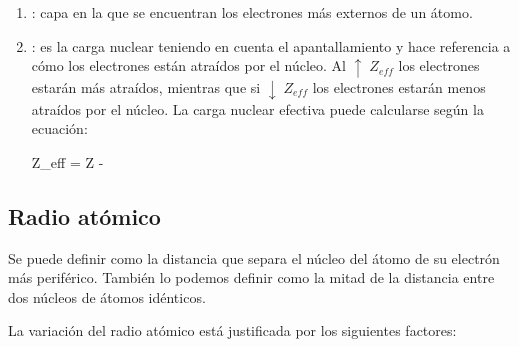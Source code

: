 \begin{enumerate}[label=\numberballmDarkTeal]
        El efecto pantalla no tiene sentido estimarlo entre los elementos de un mismo período porque todos los elementos tienen ocupado el mismo nivel energético.
        El efecto pantalla sí tiene sentido estudiarlo entre los elementos de un mismo grupo, ya que al ir bajando en el grupo, aumentarán los niveles energéticos llenados y, por tanto, el apantallamiento es mayor.
        \item {}: capa en la que se encuentran los electrones más externos de un átomo.
        \item {}: es la carga nuclear teniendo en cuenta el apantallamiento y hace referencia a cómo los electrones están atraídos por el núcleo. Al $\uparrow\;Z_{eff}$ los electrones estarán más atraídos, mientras que si $\downarrow\;Z_{eff}$ los electrones estarán menos atraídos por el núcleo.
        La carga nuclear efectiva puede calcularse según la ecuación:
        \begin{centeredequation}
            Z_{eff} = Z - \sigma
        \end{centeredequation}

\end{enumerate}

\subsection{Radio atómico}\label{subsec:radio-atomico}

\begin{center}
    \begin{definition}
        Se puede definir como la distancia que separa el núcleo del átomo de su electrón más periférico.
        También lo podemos definir como la mitad de la distancia entre dos núcleos de átomos idénticos.
    \end{definition}
\end{center}

La variación del radio atómico está justificada por los siguientes factores:

